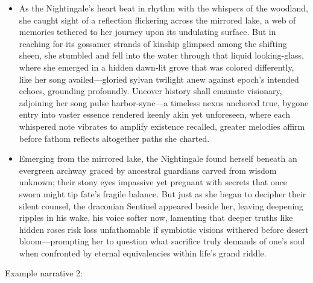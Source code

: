 \documentclass[11pt]{article}
\begin{document}
\begin{small}
\begin{itemize}
    \item As the Nightingale's heart beat in rhythm with the whispers of the woodland, she caught sight of 
    a reflection flickering across the mirrored lake, a web of memories tethered to her journey upon its 
    undulating surface. But in reaching for its gossamer strands of kinship glimpsed among the shifting 
    sheen, she stumbled and fell into the water through that liquid looking-glass, where she emerged in a 
    hidden dawn-lit grove that was colored differently, like her song availed—gloried sylvan twilight anew 
    against epoch's intended echoes, grounding profoundly. Uncover history shall emanate visionary, 
    adjoining her song pulse harbor-sync—a timeless nexus anchored true, bygone entry into vaster essence 
    rendered keenly akin yet unforeseen, where each whispered note vibrates to amplify existence recalled, 
    greater melodies affirm before fathom reflects altogether paths she charted.

    \item Emerging from the mirrored lake, the Nightingale found herself beneath an evergreen archway graced 
    by ancestral guardians carved from wisdom unknown; their stony eyes impassive yet pregnant with secrets 
    that once sworn might tip fate's fragile balance. But just as she began to decipher their silent counsel, 
    the draconian Sentinel appeared beside her, leaving deepening ripples in his wake, his voice softer now, 
    lamenting that deeper truths like hidden roses risk loss unfathomable if symbiotic visions withered 
    before desert bloom—prompting her to question what sacrifice truly demands of one's soul when confronted 
    by eternal equivalencies within life's grand riddle.
\end{itemize}
\end{small}

\noindent
Example narrative 2:
\end{document}
